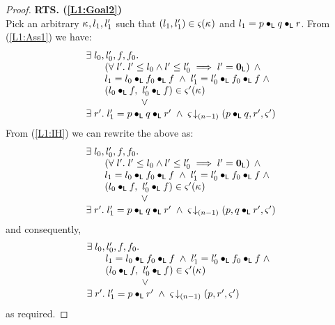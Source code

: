 \begin{lemma}
\begin{proof}
\noindent\textbf{RTS. (\ref{L1:Goal2})}\\
Pick an arbitrary $\kappa_{}, l_1, l'_1$ such that $(l_1, l'_1) \in \varsigma_{}(\kappa_{})$ and $l_1 = p \bullet_{\textsf{L}} q \bullet_{\textsf{L}} r$. From (\ref{L1:Ass1}) we have:
%
\[
\begin{array}{l}
	\exsts{l_0, l'_0, f, f_0} \nonumber\\
  \hspace*{0.5cm}
  \begin{array}{l}
  	\left(\for{l'} l' \leq l_0 \land l' \leq l'_0 \implies l' = \unitL\right)\;\land\\
  	l_1 = l_0 \composeL f_0 \composeL f \;\land\; l'_1 = l'_0 \composeL f_0 \composeL f \;\land\\
  	(l_0 \composeL f,\ l'_0 \composeL f) \in \amod{}'(\ca{}) 
  \end{array} \\
%
	\hspace*{2cm}\lor  \\
	\exsts{r'} l'_1 = p \composeL q\composeL r' \;\land\; \extendsAMUpto{\amod}{(n-1)}{p \composeL q}{r'}{\amod{}'}
\end{array}
\]
%
From (\ref{L1:IH}) we can rewrite the above as: 
%
\[
\begin{array}{l}
	\exsts{l_0, l'_0, f, f_0} \nonumber\\
  \hspace*{0.5cm}
  \begin{array}{l}
  	\left(\for{l'} l' \leq l_0 \land l' \leq l'_0 \implies l' = \unitL\right)\;\land\\
  	l_1 = l_0 \composeL f_0 \composeL f \;\land\; l'_1 = l'_0 \composeL f_0 \composeL f \;\land\\
  	(l_0 \composeL f,\ l'_0 \composeL f) \in \amod{}'(\ca{}) 
  \end{array} \\
%
	\hspace*{2cm}\lor  \\
	\exsts{r'} l'_1 = p \composeL q\composeL r' \;\land\; \extendsAMUpto{\amod}{(n-1)}{p}{q \composeL r'}{\amod{}'}
\end{array}
\]
%
and consequently,
%
\[
\begin{array}{l}
	\exsts{l_0, l'_0, f, f_0} \nonumber\\
  \hspace*{0.5cm}
  \begin{array}{l}
  	l_1 = l_0 \composeL f_0 \composeL f \;\land\; l'_1 = l'_0 \composeL f_0 \composeL f  \;\land\\
  	(l_0 \composeL f,\ l'_0 \composeL f) \in \amod{}'(\ca{}) 
  \end{array} \\
%
	\hspace*{2cm}\lor  \\
	\exsts{r'} l'_1 = p \composeL r' \;\land\; \extendsAMUpto{\amod}{(n-1)}{p}{r'}{\amod{}'}
\end{array}
\]
%
as required.
\end{proof}
\end{lemma}
